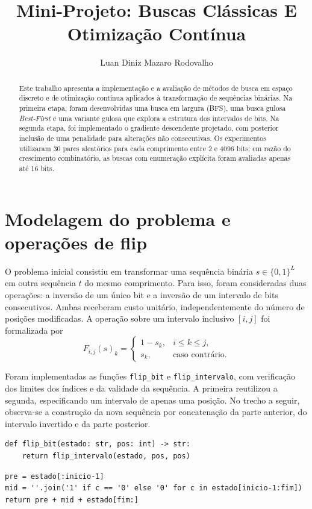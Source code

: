 \documentclass[10pt,a4paper,twocolumn]{article}
\title{Mini-Projeto: Buscas Clássicas E Otimização Contínua}
\author{Luan Diniz Mazaro Rodovalho}
\date{}
\begin{document}
\maketitle
\vspace{-2.7em}

\begin{abstract}\noindent
Este trabalho apresenta a implementação e a avaliação de métodos de busca em espaço discreto e de otimização contínua aplicados à transformação de sequências binárias. Na primeira etapa, foram desenvolvidas uma busca em largura (BFS), uma busca gulosa \textit{Best-First} e uma variante gulosa que explora a estrutura dos intervalos de bits. Na segunda etapa, foi implementado o gradiente descendente projetado, com posterior inclusão de uma penalidade para alterações não consecutivas. Os experimentos utilizaram 30 pares aleatórios para cada comprimento entre 2 e 4096 bits; em razão do crescimento combinatório, as buscas com enumeração explícita foram avaliadas apenas até 16 bits.
\end{abstract}
\vspace{-.7em}

\section{Modelagem do problema e operações de flip}
O problema inicial consistiu em transformar uma sequência binária $s\in\{0,1\}^L$ em outra sequência $t$ do mesmo comprimento. Para isso, foram consideradas duas operações: a inversão de um único bit e a inversão de um intervalo de bits consecutivos. Ambas receberam custo unitário, independentemente do número de posições modificadas. A operação sobre um intervalo inclusivo $[i,j]$ foi formalizada por
\begin{equation}
F_{i,j}(s)_k=\begin{cases}1-s_k,&i\leq k\leq j,\\s_k,&\text{caso contrário.}\end{cases}
\end{equation}

Foram implementadas as funções \texttt{flip\_bit} e \texttt{flip\_intervalo}, com verificação dos limites dos índices e da validade da sequência. A primeira reutilizou a segunda, especificando um intervalo de apenas uma posição. No trecho a seguir, observa-se a construção da nova sequência por concatenação da parte anterior, do intervalo invertido e da parte posterior.
\begin{lstlisting}
def flip_bit(estado: str, pos: int) -> str:
    return flip_intervalo(estado, pos, pos)
\end{lstlisting}
\begin{lstlisting}
pre = estado[:inicio-1]
mid = ''.join('1' if c == '0' else '0' for c in estado[inicio-1:fim])
return pre + mid + estado[fim:]
\end{lstlisting}
\end{document}
